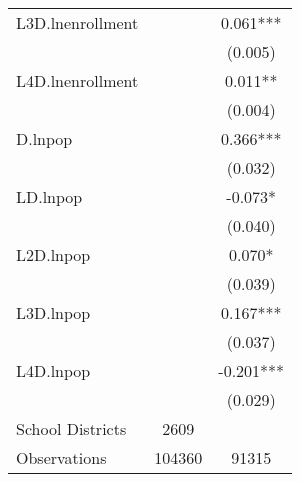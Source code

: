 \begin{tabular}{lcc}
L3D.lnenrollment    &  & 0.061*** \\
                    &  & (0.005) \\
L4D.lnenrollment    &  & 0.011** \\
                    &  & (0.004) \\
D.lnpop             &  & 0.366*** \\
                    &  & (0.032) \\
LD.lnpop            &  & -0.073* \\
                    &  & (0.040) \\
L2D.lnpop           &  & 0.070* \\
                    &  & (0.039) \\
L3D.lnpop           &  & 0.167*** \\
                    &  & (0.037) \\
L4D.lnpop           &  & -0.201*** \\
                    &  & (0.029) \\
\hline
School Districts    & 2609 & \\
Observations        & 104360 & 91315 \\
\hline
\end{tabular}
